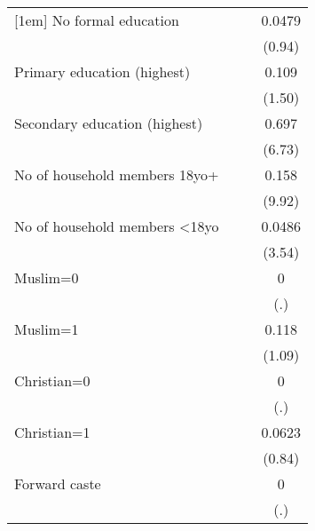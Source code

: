 {\begin{tabular}{l*{3}{c}}
[1em]
No formal education &                     &                     &      0.0479         \\
                    &                     &                     &      (0.94)         \\
[1em]
Primary education (highest)&                     &                     &       0.109         \\
                    &                     &                     &      (1.50)         \\
[1em]
Secondary education (highest)&                     &                     &       0.697\sym{***}\\
                    &                     &                     &      (6.73)         \\
[1em]
No of household members 18yo+&                     &                     &       0.158\sym{***}\\
                    &                     &                     &      (9.92)         \\
[1em]
No of household members \textless{}18yo&                     &                     &      0.0486\sym{***}\\
                    &                     &                     &      (3.54)         \\
[1em]
Muslim=0            &                     &                     &           0         \\
                    &                     &                     &         (.)         \\
[1em]
Muslim=1            &                     &                     &       0.118         \\
                    &                     &                     &      (1.09)         \\
[1em]
Christian=0         &                     &                     &           0         \\
                    &                     &                     &         (.)         \\
[1em]
Christian=1         &                     &                     &      0.0623         \\
                    &                     &                     &      (0.84)         \\
[1em]
Forward caste       &                     &                     &           0         \\
                    &                     &                     &         (.)         \\

\end{tabular}}
